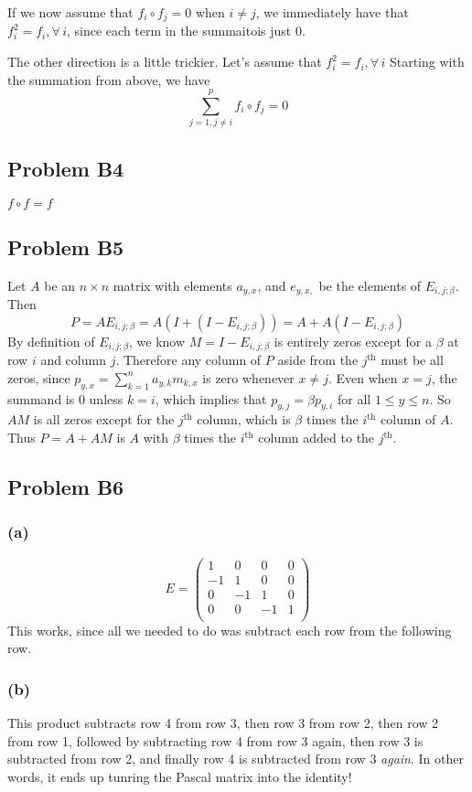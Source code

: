 \documentclass{article}
\begin{document}
If we now assume that $f_i \circ f_j = 0$ when $i \neq j$, we immediately have
that $f_i^2 = f_i, \forall\, i$, since each term in the summaitois just 0.

The other direction is a little trickier. Let's assume that $f_i^2  = f_i,
\forall\, i$
Starting with the summation from above, we have
\[\sum_{j=1,j \neq i}^p f_i \circ f_j = 0 \]

\subsection{Problem B4}
$f \circ f = f$

\subsection{Problem B5}
Let $A$ be an $n\times n$ matrix with elements $a_{y,x}$, and $e_{y,x,}$ be the
elements of $E_{i,j;\beta}$.
Then 
\[P = AE_{i,j;\beta} = A(I + (I - E_{i,j;\beta})) = A + A(I - E_{i,j;\beta})\]
By definition of $E_{i,j;\beta}$, we know $M = I - E_{i,j;\beta}$ is entirely
zeros except for a $\beta$ at row $i$ and column $j$.
Therefore any column of $P$ aside from the $j^\textrm{th}$ must be all zeros,
since $p_{y,x} = \sum_{k=1}^n a_{y,k}m_{k,x}$ is zero whenever $x \neq j$.
Even when $x = j$, the summand is 0 unless $k = i$, which implies that $p_{y,j}
= \beta p_{y,i}$ for all $1 \leq y \leq n$.
So $AM$ is all zeros except for the $j^\textrm{th}$ column, which is $\beta$
times the $i^\textrm{th}$ column of $A$.
Thus $P = A + AM$ is $A$ with $\beta$ times the $i^\textrm{th}$ column added to
the $j^\textrm{th}$.

\subsection{Problem B6}
\subsubsection{(a)}
\[
E=\left( 
\begin{array}{cccc}
1 &0 &0 &0\\
-1&1 &0 &0\\
0 &-1&1 &0\\
0 &0 &-1&1\\
\end{array}
\right)
\]
This works, since all we needed to do was subtract each row from the following
row.
\subsubsection{(b)}
This product subtracts row 4 from row 3, then row 3 from row 2, then row 2 from
row 1, followed by subtracting row 4 from row 3 again, then row 3 is subtracted
from row 2, and finally row 4 is subtracted from row 3 \emph{again}.
In other words, it ends up tunring the Pascal matrix into the identity!
\end{document}
